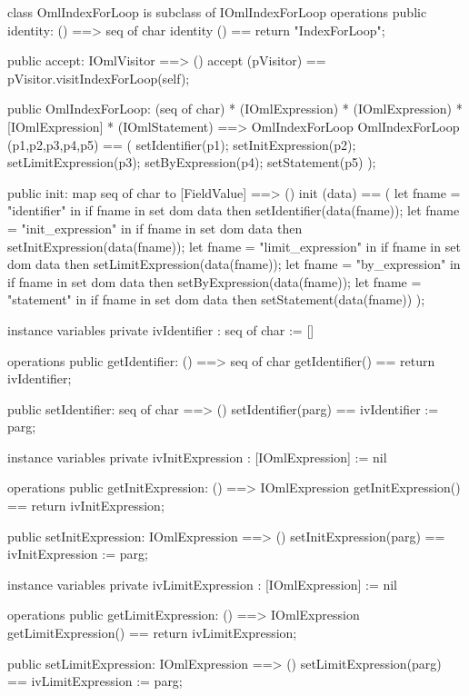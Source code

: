 \begin{vdm_al}
class OmlIndexForLoop is subclass of IOmlIndexForLoop
operations
  public identity: () ==> seq of char
  identity () == return "IndexForLoop";

  public accept: IOmlVisitor ==> ()
  accept (pVisitor) == pVisitor.visitIndexForLoop(self);

  public OmlIndexForLoop:
      (seq of char) *
      (IOmlExpression) *
      (IOmlExpression) *
      [IOmlExpression] *
      (IOmlStatement) ==> OmlIndexForLoop
  OmlIndexForLoop (p1,p2,p3,p4,p5) == 
   ( setIdentifier(p1);
     setInitExpression(p2);
     setLimitExpression(p3);
     setByExpression(p4);
     setStatement(p5) );

  public init: map seq of char to [FieldValue] ==> ()
  init (data) ==
    ( let fname = "identifier" in
        if fname in set dom data
        then setIdentifier(data(fname));
      let fname = "init_expression" in
        if fname in set dom data
        then setInitExpression(data(fname));
      let fname = "limit_expression" in
        if fname in set dom data
        then setLimitExpression(data(fname));
      let fname = "by_expression" in
        if fname in set dom data
        then setByExpression(data(fname));
      let fname = "statement" in
        if fname in set dom data
        then setStatement(data(fname)) );

instance variables
  private ivIdentifier : seq of char := []

operations
  public getIdentifier: () ==> seq of char
  getIdentifier() == return ivIdentifier;

  public setIdentifier: seq of char ==> ()
  setIdentifier(parg) == ivIdentifier := parg;

instance variables
  private ivInitExpression : [IOmlExpression] := nil

operations
  public getInitExpression: () ==> IOmlExpression
  getInitExpression() == return ivInitExpression;

  public setInitExpression: IOmlExpression ==> ()
  setInitExpression(parg) == ivInitExpression := parg;

instance variables
  private ivLimitExpression : [IOmlExpression] := nil

operations
  public getLimitExpression: () ==> IOmlExpression
  getLimitExpression() == return ivLimitExpression;

  public setLimitExpression: IOmlExpression ==> ()
  setLimitExpression(parg) == ivLimitExpression := parg;


\end{vdm_al}
